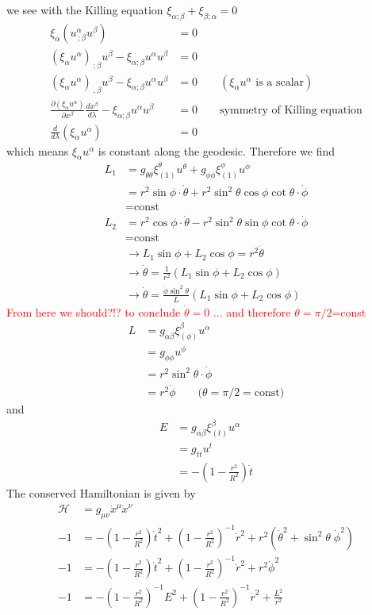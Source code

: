 \documentclass[10pt,a4paper]{article}
\theoremstyle{definition}
\begin{document}
we see with the Killing equation $\xi_{\alpha;\beta}+\xi_{\beta;\alpha}=0$
\begin{align}
\xi_\alpha (u^\alpha_{\,;\beta}u^\beta)&=0\\
(\xi_\alpha u^\alpha)_{\,;\beta}u^\beta-\xi_{\alpha;\beta}u^\alpha u^{\beta}&=0\\
(\xi_\alpha u^\alpha)_{\,,\beta}u^\beta-\xi_{\alpha;\beta}u^\alpha u^{\beta}&=0\qquad (\xi_\alpha u^\alpha \text{ is a scalar})\\
\frac{\partial(\xi_\alpha u^\alpha)}{\partial x^\beta}\frac{dx^\beta}{d\lambda}-\xi_{\alpha;\beta}u^\alpha u^{\beta}&=0\qquad\text{symmetry of Killing equation}\\
\frac{d}{d\lambda}(\xi_\alpha u^\alpha)&=0
\end{align}
which means $\xi_\alpha u^\alpha$ is constant along the geodesic. Therefore we find
\begin{align}
L_1&=g_{\theta\theta}\xi^\theta_{(1)}u^\theta+g_{\phi\phi}\xi^\phi_{(1)}u^\phi\\
&=r^2\sin\phi\cdot\dot{\theta}+r^2\sin^2\theta\cos\phi\cot\theta\cdot\dot{\phi}\\
&=\text{const}\\
L_2&=r^2\cos\phi\cdot\dot{\theta}-r^2\sin^2\theta\sin\phi\cot\theta\cdot\dot{\phi}\\
&=\text{const}\\
&\rightarrow L_1\sin\phi+L_2\cos\phi=r^2\dot\theta\\
&\rightarrow\dot\theta=\frac{1}{r^2}(L_1\sin\phi+L_2\cos\phi)\\
&\rightarrow\dot\theta=\frac{\dot\phi\sin^2\theta}{L}(L_1\sin\phi+L_2\cos\phi)
\end{align}
\textcolor{red}{From here we should?!? to conclude $\dot{\theta}=0$ ... and therefore $\theta=\pi/2$=const}
\begin{align}
L&=g_{\alpha\beta}\xi^\beta_{(\phi)}u^\alpha\\
&=g_{\phi\phi}u^\phi\\
&=r^2\sin^2\theta \cdot\dot{\phi}\\
&=r^2\dot{\phi}\qquad{(\theta=\pi/2=\text{const}})
\end{align}
and
\begin{align}
E&=g_{\alpha\beta}\xi^\beta_{(t)}u^\alpha\\
&=g_{tt}u^t\\
&=-\left(1-\frac{r^2}{R^2}\right)\dot{t}
\end{align}
The conserved Hamiltonian is given by
\begin{align}
\mathcal{H}
&=g_{\mu\nu}\dot{x}^\mu\dot{x}^\nu\\
-1&=-\left(1-\frac{r^2}{R^2}\right)\dot{t}^2+\left(1-\frac{r^2}{R^2}\right)^{-1}\dot{r}^2+r^2(\dot{\theta}^2+\sin^2\theta\;\dot{\phi}^2)\\
-1&=-\left(1-\frac{r^2}{R^2}\right)\dot{t}^2+\left(1-\frac{r^2}{R^2}\right)^{-1}\dot{r}^2+r^2\dot{\phi}^2\\
-1&=-\left(1-\frac{r^2}{R^2}\right)^{-1}E^2+\left(1-\frac{r^2}{R^2}\right)^{-1}\dot{r}^2+\frac{L^2}{r^2}
\end{align}
\end{document}
